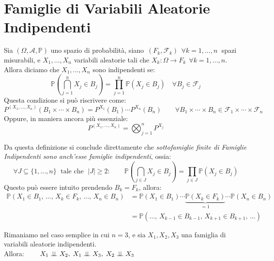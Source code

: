 \section{Famiglie di Variabili Aleatorie Indipendenti}
\begin{definizione}
    Sia $(\Omega, \mathcal{A}, \mathbb{P})$ uno spazio di probabilità, siano $\,(F_k, \mathcal{F}_k)\;\,\forall k=1, ..., n\;$ spazi misurabili, e $X_1, ..., X_n$ variabili aleatorie tali che \(X_k:\Omega\to F_k\;\,\forall k=1, ..., n\).\\
    Allora diciamo che $X_1, ..., X_n$ sono indipendenti se:
    \[\boxed{\mathbb{P}\left(\bigcap_{j = 1}^n X_j\in B_j\right) = \prod_{j=1}^n\mathbb{P}(X_j \in B_j)}\quad  \forall B_j \in \mathcal{F}_j\]
    Questa condizione si può riscrivere come:
    \[P^{(X_1, ..., X_n)} (B_1\times\cdots\times B_n) = P^{X_1}(B_1)\cdots P^{X_n}(B_n)\qquad \forall B_1\times\cdots\times B_n\in \mathcal{F}_1\times\cdots\times \mathcal{F}_n\]
    Oppure, in maniera ancora più essenziale: 
    \[P^{(X_1, ...,X_n)} = \bigotimes_{j = 1}^n P^{X_j}\]
\end{definizione}

Da questa definizione si conclude direttamente che \textit{sottofamiglie finite di Famiglie Indipendenti sono anch'esse famiglie indipendenti}, ossia:
\[\forall J\subseteq\{1, ..., n\}\;\text{ tale che }\;|J|\geq 2:\qquad\mathbb{P}\left(\bigcap_{j \in J} X_j\in B_j\right) = \prod_{j\in J}\mathbb{P}(X_j \in B_j)\]
Questo può essere intuito prendendo $B_k = F_k$, allora:
\begin{align*}
    \mathbb{P}(X_1 \in B_1,\, \ldots,\, X_k \in F_k,\, \ldots,\, X_n \in B_n)
&= \mathbb{P}(X_1 \in B_1) \cdots \underbrace{\mathbb{P}(X_k \in F_k)}_{=1} \cdots \mathbb{P}(X_n \in B_n)\\
&= \mathbb{P}(\ldots,\, X_{k-1} \in B_{k-1},\, X_{k+1} \in B_{k+1},\, \ldots)
\end{align*}

\begin{esempio}
    Rimaniamo nel caso semplice in cui $n=3$, e sia $X_1, X_2, X_3$ una famiglia di variabili aleatorie indipendenti.\\
    Allora: $\qquad X_1\ind X_2, \;X_1\ind X_3,\; X_2\ind X_3$
\end{esempio}

